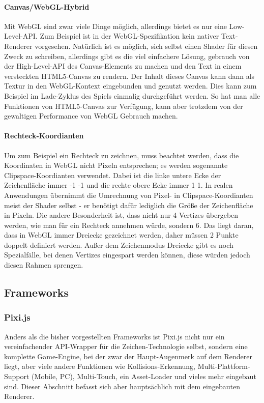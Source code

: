 \documentclass[a4paper, 12pt]{article}
\begin{document}
\paragraph{Canvas/WebGL-Hybrid} Mit WebGL sind zwar viele Dinge möglich, allerdings bietet es nur eine Low-Level-API. Zum Beispiel ist in der WebGL-Spezifikation kein nativer Text-Renderer vorgesehen. Natürlich ist es möglich, sich selbst einen Shader für diesen Zweck zu schreiben, allerdings gibt es die viel einfachere Lösung, gebrauch von der High-Level-API des Canvas-Elements zu machen und den Text in einem versteckten HTML5-Canvas zu rendern. Der Inhalt dieses Canvas kann dann als Textur in den WebGL-Kontext eingebunden und genutzt werden. Dies kann zum Beispiel im Lade-Zyklus des Spiels einmalig durchgeführt werden. So hat man alle Funktionen von HTML5-Canvas zur Verfügung, kann aber trotzdem von der gewaltigen Performance von WebGL Gebrauch machen.
\paragraph{Rechteck-Koordianten} Um zum Beispiel ein Rechteck zu zeichnen, muss beachtet werden, dass die Koordinaten in WebGL nicht Pixeln entsprechen; es werden sogenannte Clipspace-Koordianten verwendet. Dabei ist die linke untere Ecke der Zeichenfläche immer -1 -1 und die rechte obere Ecke immer 1 1. In realen Anwendungen übernimmt die Umrechnung von Pixel- in Clipspace-Koordianten meist der Shader selbst - er benötigt dafür lediglich die Größe der Zeichenfläche in Pixeln. Die andere Besonderheit ist, dass nicht nur 4 Vertizes übergeben werden, wie man für ein Rechteck annehmen würde, sondern 6. Das liegt daran, dass in WebGL immer Dreiecke gezeichnet werden, daher müssen 2 Punkte doppelt definiert werden. Außer dem Zeichenmodus Dreiecke gibt es noch Spezialfälle, bei denen Vertizes eingespart werden können, diese würden jedoch diesen Rahmen sprengen.
\newpage
\subsection{Frameworks}
\subsubsection{Pixi.js} Anders als die bisher vorgestellten Frameworks ist Pixi.js nicht nur ein vereinfachender API-Wrapper für die Zeichen-Technologie selbst, sondern eine komplette Game-Engine, bei der zwar der Haupt-Augenmerk auf dem Renderer liegt, aber viele andere Funktionen wie Kollisions-Erkennung, Multi-Plattform-Support (Mobile, PC), Multi-Touch, ein Asset-Loader und vieles mehr eingebaut sind. Dieser Abschnitt befasst sich aber hauptsächlich mit dem eingebauten Renderer.
\end{document}
